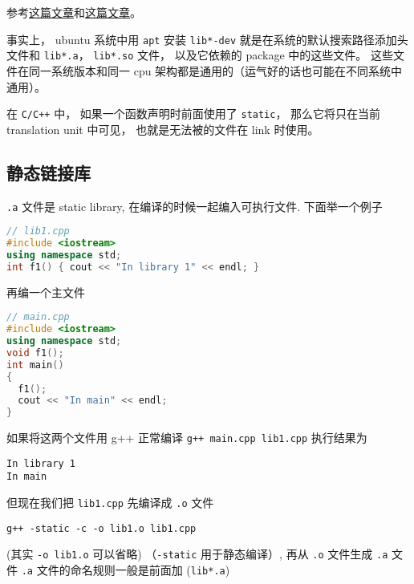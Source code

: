 
\begin{issues}
\issueDraft
\end{issues}


参考\href{https://blog.feabhas.com/2014/04/static-and-dynamic-libraries-on-linux/}{这篇文章}和\href{https://gcc.gnu.org/onlinedocs/gcc/Link-Options.html}{这篇文章}。

事实上， ubuntu 系统中用 \verb|apt| 安装 \verb|lib*-dev| 就是在系统的默认搜索路径添加头文件和 \verb|lib*.a|， \verb|lib*.so| 文件， 以及它依赖的 package 中的这些文件。 这些文件在同一系统版本和同一 cpu 架构都是通用的（运气好的话也可能在不同系统中通用）。

在 \verb|C/C++| 中， 如果一个函数声明时前面使用了 \verb|static|， 那么它将只在当前 translation unit 中可见， 也就是无法被的文件在 link 时使用。

\subsection{静态链接库}

\verb|.a| 文件是 static library, 在编译的时候一起编入可执行文件. 下面举一个例子

\begin{lstlisting}[language=cpp]
// lib1.cpp
#include <iostream>
using namespace std;
int f1() { cout << "In library 1" << endl; }
\end{lstlisting}

再编一个主文件

\begin{lstlisting}[language=cpp]
// main.cpp
#include <iostream>
using namespace std;
void f1();
int main()
{
  f1();
  cout << "In main" << endl;
}
\end{lstlisting}

如果将这两个文件用 g++ 正常编译 \verb`g++ main.cpp lib1.cpp` 执行结果为
\begin{lstlisting}[language=none]
In library 1
In main
\end{lstlisting}
但现在我们把 \verb|lib1.cpp| 先编译成 \verb|.o| 文件

\begin{lstlisting}[language=none]
g++ -static -c -o lib1.o lib1.cpp
\end{lstlisting}

(其实 \verb`-o lib1.o` 可以省略) （\verb`-static` 用于静态编译）, 再从 \verb|.o| 文件生成 \verb|.a| 文件 \verb|.a| 文件的命名规则一般是前面加 (\verb`lib*.a`)

